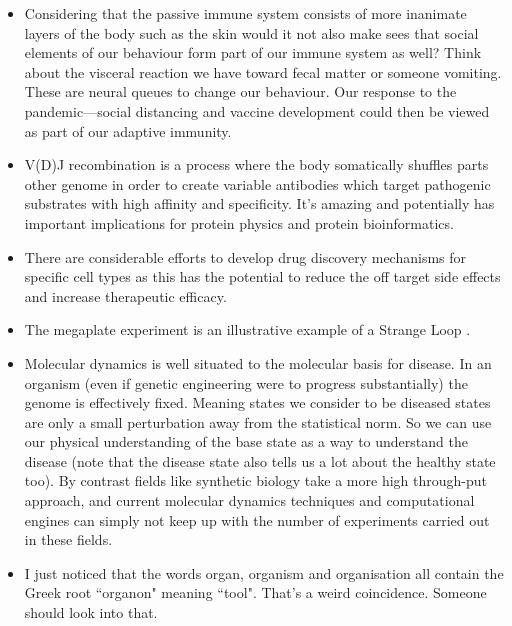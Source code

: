 \begin{itemize}
\item Considering that the passive immune system consists of more inanimate layers of the body such as the skin would it not also make sees that social elements of our behaviour form part of our immune system as well? Think about the visceral reaction we have toward fecal matter or someone vomiting. These are neural queues to change our behaviour. Our response to the pandemic---social distancing and vaccine development could then be viewed as part of our adaptive immunity. 

\item V(D)J recombination is a process where the body somatically shuffles parts other genome in order to create variable antibodies which target pathogenic substrates with high affinity and specificity. It's amazing and potentially has important implications for protein physics and protein bioinformatics.

\item There are considerable efforts to develop drug discovery mechanisms for specific cell types \cite{yu2020} as this has the potential to reduce the off target side effects and increase therapeutic efficacy. 

\item The megaplate experiment\cite{baym2016} is an illustrative example of a Strange Loop \cite{hofstadter2007}. 

\item Molecular dynamics is well situated to the molecular basis for disease. In an organism (even if genetic engineering were to progress substantially) the genome is effectively fixed. Meaning states we consider to be diseased states are only a small perturbation away from the statistical norm. So we can use our physical understanding of the base state as a way to understand the disease (note that the disease state also tells us a lot about the healthy state too). By contrast fields like synthetic biology take a more high through-put approach, and current molecular dynamics techniques and computational engines can simply not keep up with the number of experiments carried out in these fields.  

\item I just noticed that the words organ, organism and organisation all contain the Greek root ``organon" meaning ``tool". That's a weird coincidence. Someone should look into that. 
\end{itemize}
